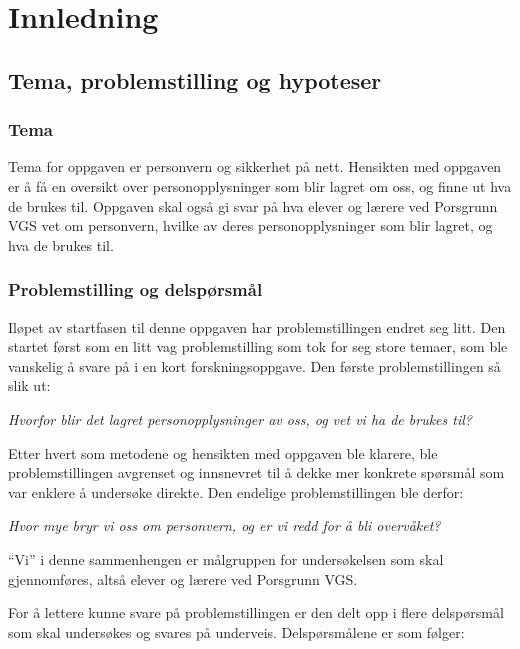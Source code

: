 \section{Innledning}

\subsection{Tema, problemstilling og hypoteser}\label{subsec:problemstilling}

\subsubsection{Tema}
Tema for oppgaven er personvern og sikkerhet på nett. Hensikten med oppgaven er å få en oversikt over personopplysninger som blir lagret om oss, og finne ut hva de brukes til. Oppgaven skal også gi svar på hva elever og lærere ved Porsgrunn VGS vet om personvern, hvilke av deres personopplysninger som blir lagret, og hva de brukes til.

\subsubsection{Problemstilling og delspørsmål}\label{subsubsec:problemstilling}
Iløpet av startfasen til denne oppgaven har problemstillingen endret seg litt. Den startet først som en litt vag problemstilling som tok for seg store temaer, som ble vanskelig å svare på i en kort forskningsoppgave. Den første problemstillingen så slik ut:

\textit{Hvorfor blir det lagret personopplysninger av oss, og vet vi ha de brukes til?}

Etter hvert som metodene og hensikten med oppgaven ble klarere, ble problemstillingen avgrenset og innsnevret til å dekke mer konkrete spørsmål som var enklere å undersøke direkte. Den endelige problemstillingen ble derfor:

\textit{Hvor mye bryr vi oss om personvern, og er vi redd for å bli overvåket?}

``Vi'' i denne sammenhengen er målgruppen for undersøkelsen som skal gjennomføres, altså elever og lærere ved Porsgrunn VGS. 

For å lettere kunne svare på problemstillingen er den delt opp i flere delspørsmål som skal undersøkes og svares på underveis. Delspørsmålene er som følger:

